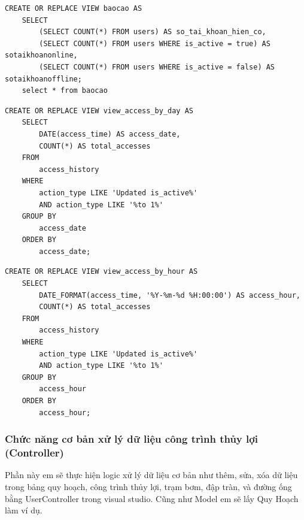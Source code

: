 \documentclass{article} %
\begin{document}
\begin{lstlisting}[caption={BaoCao Creater View Definition}, label={tab:BaoCaoView}]   
    CREATE OR REPLACE VIEW baocao AS
    SELECT 
        (SELECT COUNT(*) FROM users) AS so_tai_khoan_hien_co,
        (SELECT COUNT(*) FROM users WHERE is_active = true) AS sotaikhoanonline,
        (SELECT COUNT(*) FROM users WHERE is_active = false) AS sotaikhoanoffline;
    select * from baocao  
\end{lstlisting}
\newpage
\begin{lstlisting}[caption={ViewAccessByDay Creater View Definition}, label={tab:ViewAccessByDayView}]   
    CREATE OR REPLACE VIEW view_access_by_day AS
    SELECT 
        DATE(access_time) AS access_date,  
        COUNT(*) AS total_accesses         
    FROM 
        access_history
    WHERE
        action_type LIKE 'Updated is_active%'  
        AND action_type LIKE '%to 1%'           
    GROUP BY 
        access_date
    ORDER BY 
        access_date;  
\end{lstlisting}

\begin{lstlisting}[caption={ViewAccessByHour Creater View Definition}, label={tab:ViewAccessByHourView}]   
    CREATE OR REPLACE VIEW view_access_by_hour AS
    SELECT 
        DATE_FORMAT(access_time, '%Y-%m-%d %H:00:00') AS access_hour,  
        COUNT(*) AS total_accesses                                         
    FROM 
        access_history
    WHERE
        action_type LIKE 'Updated is_active%'  
        AND action_type LIKE '%to 1%'           
    GROUP BY 
        access_hour
    ORDER BY 
        access_hour;   
\end{lstlisting}

\subsubsection{Chức năng cơ bản xử lý dữ liệu công trình thủy lợi (Controller)}
Phần này em sẽ thực hiện logic xử lý dữ liệu cơ bản như thêm, sửa, xóa dữ liệu trong bảng quy hoạch, công trình thủy lợi, trạm bơm, đập tràn, và đường ống bằng UserController trong visual studio. Cũng như Model em sẽ lấy Quy Hoạch làm ví dụ.
\end{document}
